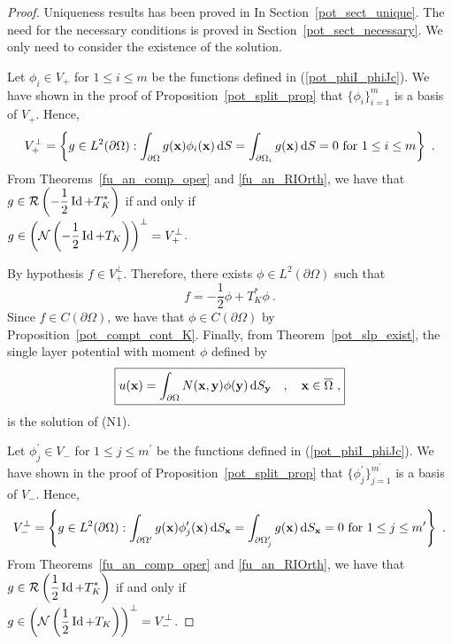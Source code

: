 \begin{proof}
Uniqueness results has been proved in In
Section~\ref{pot_sect_unique}.  The need for the necessary conditions
is proved in Section~\ref{pot_sect_necessary}.  We only need to
consider the existence of the solution.

  Let $\phi_i \in V_+$ for $1 \leq i \leq m$ be the
functions defined in (\ref{pot_phiI_phiJc}).  We have shown in the
proof of Proposition~\ref{pot_split_prop} that
$\displaystyle \{\phi_i\}_{i=1}^m$ is a basis of $V_+$.  Hence,
\[
V_+^\perp = \left\{ g \in L^2(\partial \Omega) :
\int_{\partial \Omega} g(\mathbf{x}) \phi_i(\mathbf{x}) \,\mathrm{d}{S}
= \int_{\partial \Omega_i} g(\mathbf{x}) \,\mathrm{d}{S} = 0 \ \text{for}
\ 1 \leq i \leq m \right\} \ .
\]
From Theorems~\ref{fu_an_comp_oper} and \ref{fu_an_RIOrth},
we have that $\displaystyle g \in \mathcal{R} \left(-\frac{1}{2} \operatorname{Id} +T^\ast_K\right)$
if and only if\\
$\displaystyle g \in \left( \mathcal{N} \left( -\frac{1}{2} \operatorname{Id} +
T_K\right)\right)^\perp = V_+^\perp$.

By hypothesis $\displaystyle f \in V_+^\perp$.  Therefore, there exists
$\displaystyle \phi \in L^2(\partial \Omega)$ such that
\[
\boxed{
f = -\frac{1}{2}\phi +T^\ast_K \phi \  .
}
\]
Since $f\in C(\partial \Omega)$, we have that
$\phi \in C(\partial \Omega)$ by Proposition~\ref{pot_compt_cont_K}.
Finally, from Theorem~\ref{pot_slp_exist}, the single layer potential 
with moment $\phi$ defined by
\[
\boxed{
u(\mathbf{x}) = \int_{\partial \Omega} N(\mathbf{x},\mathbf{y})
\phi(\mathbf{y}) \,\mathrm{d}{S}_{\mathbf{y}} \quad , \quad \mathbf{x} \in \overline{\Omega} \ ,
}
\]
is the solution of (N1).

  Let $\displaystyle \phi_j^{\prime} \in V_-$ for
$\displaystyle 1 \leq j \leq m^{\prime}$
be the functions defined in (\ref{pot_phiI_phiJc}).  We have shown in
the proof of Proposition~\ref{pot_split_prop} that
$\displaystyle \{\phi_j^{\prime}\}_{j=1}^{m^{\prime}}$ is a basis of
$V_-$.  Hence,
\[
V_-^\perp = \left\{ g \in L^2(\partial \Omega) :
\int_{\partial \Omega^{\prime}} g(\VEC{x}) \phi_j^{\prime}(\VEC{x}) \dss{S}{x}
= \int_{\partial \Omega_j^{\prime}} g(\VEC{x}) \dss{S}{x} = 0 \ \text{for}
\ 1 \leq j \leq m^{\prime} \right\} \ .
\]
From Theorems~\ref{fu_an_comp_oper} and \ref{fu_an_RIOrth},
we have that $\displaystyle g \in \mathcal{R} \left(\frac{1}{2} \operatorname{Id} +T^\ast_K\right)$
if and only if\\
$\displaystyle g \in \left(\mathcal{N} \left(\frac{1}{2} \operatorname{Id} +T_K\right)\right)^\perp
= V_-^\perp$.


\end{proof}
